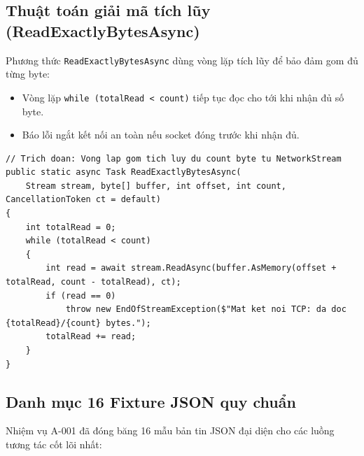 \documentclass[12pt,a4paper]{article}
\begin{document}
\subsection{Thuật toán giải mã tích lũy (ReadExactlyBytesAsync)}
Phương thức \texttt{ReadExactlyBytesAsync} dùng vòng lặp tích lũy để bảo đảm gom đủ từng byte:

\begin{orientationbox}
\begin{itemize}[leftmargin=1.5em, itemsep=1pt]
  \item Vòng lặp \texttt{while (totalRead < count)} tiếp tục đọc cho tới khi nhận đủ số byte.
  \item Báo lỗi ngắt kết nối an toàn nếu socket đóng trước khi nhận đủ.
\end{itemize}
\end{orientationbox}

\begin{lstlisting}[language=CSharp, caption={Ví dụ rút gọn dựa trên mã nguồn hiện tại: ReadExactlyBytesAsync trong FrameCodec.cs}]
// Trich doan: Vong lap gom tich luy du count byte tu NetworkStream
public static async Task ReadExactlyBytesAsync(
    Stream stream, byte[] buffer, int offset, int count, CancellationToken ct = default)
{
    int totalRead = 0;
    while (totalRead < count)
    {
        int read = await stream.ReadAsync(buffer.AsMemory(offset + totalRead, count - totalRead), ct);
        if (read == 0)
            throw new EndOfStreamException($"Mat ket noi TCP: da doc {totalRead}/{count} bytes.");
        totalRead += read;
    }
}
\end{lstlisting}

\subsection{Danh mục 16 Fixture JSON quy chuẩn}
Nhiệm vụ A-001 đã đóng băng 16 mẫu bản tin JSON đại diện cho các luồng tương tác cốt lõi nhất:
\end{document}
